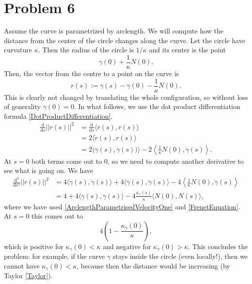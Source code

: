 \section{Problem 6}

Assume the curve is parametrized by arclength. We will compute how the distance from the center of the circle changes along the curve. Let the circle have curvature \(\kappa\). Then the radius of the circle is \(1/\kappa\) and its center is the point
\[
\gamma(0) + \frac1\kappa N(0).
\]
Then, the vector from the centre to a point on the curve is
\[
r(s) := \gamma(s) - \gamma(0) - \frac1\kappa N(0).
\]
This is clearly not changed by translating the whole configuration, so without loss of generality \(\gamma(0) = 0\). In what follows, we use the dot product differentiation formula \ref{DotProductDifferentiation}.
\begin{align*}
    \frac{\mathrm{d}}{\mathrm{d}s} \lvert \lvert r(s) \rvert \rvert^2 &= \frac{\mathrm{d}}{\mathrm{d}s} \langle r(s), r(s) \rangle \\
                                                                      &=  2\langle \dot{r}(s), r(s) \rangle \\
                                                                      &= 2\langle \gamma(s), \dot{\gamma}(s))\rangle - 2\left\langle \frac1\kappa N(0), \dot{\gamma}(s)\right\rangle.
\end{align*}
At \( s = 0 \) both terms come out to \( 0 \), so we need to compute another derivative to see what is going on. We have
\begin{align*}
    \frac{\mathrm{d^2}}{\mathrm{d}s^2} \lvert \lvert r(s) \rvert \rvert^2 &= 4\langle \dot{\gamma}(s), \dot{\gamma}(s)\rangle + 4\langle \gamma(s), \ddot\gamma(s) \rangle - 4\left\langle \frac1\kappa N(0), \ddot\gamma (s) \right\rangle \\
                                                                      &=  4 + 4\langle \gamma(s), \ddot\gamma(s) \rangle - 4\frac{\kappa_\gamma(s)}{\kappa}\langle N(0), N(s) \rangle,
\end{align*}
where we have used \ref{ArclengthParametrisedVelocityOne} and \ref{FrenetEquation}. At \( s = 0 \) this comes out to
\[
    4 \left(1 - \frac{\kappa_\gamma(0)}{\kappa}\right),
\]
which is positive for \(\kappa_\gamma(0) < \kappa\) and negative for \( \kappa_\gamma(0) > \kappa \). This concludes the problem: for example, if the curve \(\gamma\) stays inside the circle (even locally!), then we cannot have \(\kappa_\gamma(0) < \kappa \), because then the distance would be increasing (by Taylor \ref{Taylor}).

